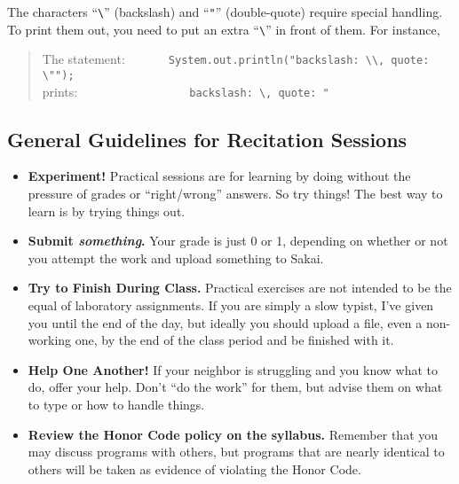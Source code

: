 The characters ``\verb$\$'' (backslash) and ``\verb$"$'' (double-quote)
require special handling. To print them out, you need to put an extra
``\verb$\$'' in front of them. For instance,
\begin{quote}
The statement:\ \ \ \ \ \ \ \verb$System.out.println("backslash: \\, quote: \"");$\\
prints:\ \ \ \ \ \ \ \ \ \ \ \ \ \ \ \ \ \ 
\verb$backslash: \, quote: "$
\end{quote}
\subsection*{General Guidelines for Recitation Sessions}
\begin{itemize}
\item
{\bf Experiment!} 
Practical sessions are for learning by doing
without the pressure of grades or ``right/wrong'' answers. So try
things!  The best way to learn is by trying things out.
\item
{\bf Submit \textbf{\textit{something}}.} Your grade is just 0 or 1,
depending on whether or not you attempt the work and upload something to 
Sakai. 
\item
{\bf Try to Finish During Class.} Practical exercises are not intended
to be the equal of laboratory assignments. If you are simply a slow
typist, I've given you until the end of the day, but ideally you should
upload a file, even a non-working one, by the end of the class period and 
be finished with it.
\item
{\bf Help One Another!} 
If your neighbor is struggling and you know what
to do, offer your help. Don't ``do the work'' for them, but advise them on what
to type or how to handle things.
\item
{\bf Review the Honor Code policy on the syllabus.} Remember that you
may discuss programs with others, but programs that are nearly identical
to others will be taken as evidence of violating the Honor Code.
\end{itemize}

